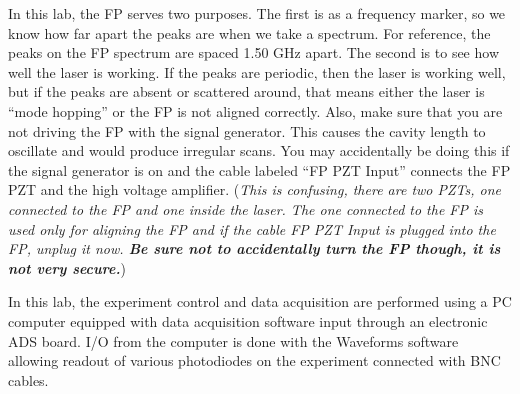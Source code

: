 \documentclass{../lab}
\begin{document}
\begin{enumerate}
\newpage
    
    In this lab, the FP serves two purposes. The first is as a frequency marker, so we know how far apart the peaks are when we take a spectrum. For reference, the peaks on the FP spectrum are spaced 1.50 GHz apart. The second is to see how well the laser is working. If the peaks are periodic, then the laser is working well, but if the peaks are absent or scattered around, that means either the laser is ``mode hopping'' or the FP is not aligned correctly. Also, make sure that you are not driving the FP with the signal generator. This causes the cavity length to oscillate and would produce irregular scans. You may accidentally be doing this if the signal generator is on and the cable labeled ``FP PZT Input'' connects the FP PZT and the high voltage amplifier. (\emph{This is confusing, there are two PZTs, one connected to the FP and one inside the laser. The one connected to the FP is used only for aligning the FP and if the cable FP PZT Input is plugged into the FP, unplug it now. \textbf{ Be sure not to accidentally turn the FP though, it is not very secure.}})
    
    
    In this lab, the experiment control and data acquisition are performed using a PC computer equipped with data acquisition software input through an electronic ADS board. I/O from the computer is done with the Waveforms software allowing readout of various photodiodes on the experiment connected with BNC cables.
    

\end{enumerate}
\end{document}
